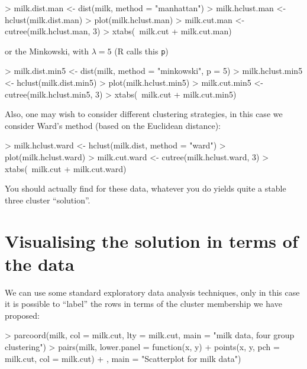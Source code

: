 \begin{Schunk}
\begin{Sinput}
> milk.dist.man <- dist(milk, method = "manhattan")
> milk.hclust.man <- hclust(milk.dist.man)
> plot(milk.hclust.man)
> milk.cut.man <- cutree(milk.hclust.man, 3)
> xtabs(~milk.cut + milk.cut.man)
\end{Sinput}
\end{Schunk}

or the Minkowski, with $\lambda=5$ (R calls this \texttt{p})

\begin{Schunk}
\begin{Sinput}
> milk.dist.min5 <- dist(milk, method = "minkowski", p = 5)
> milk.hclust.min5 <- hclust(milk.dist.min5)
> plot(milk.hclust.min5)
> milk.cut.min5 <- cutree(milk.hclust.min5, 3)
> xtabs(~milk.cut + milk.cut.min5)
\end{Sinput}
\end{Schunk}


Also, one may wish to consider different clustering strategies, in this case we consider Ward's method (based on the Euclidean distance):

\begin{Schunk}
\begin{Sinput}
> milk.hclust.ward <- hclust(milk.dist, method = "ward")
> plot(milk.hclust.ward)
> milk.cut.ward <- cutree(milk.hclust.ward, 3)
> xtabs(~milk.cut + milk.cut.ward)
\end{Sinput}
\end{Schunk}


You should actually find for these data, whatever you do yields quite a stable three cluster ``solution''.


\section{Visualising the solution in terms of the data}

We can use some standard exploratory data analysis techniques, only in this case it is possible to ``label'' the rows in terms of the cluster membership we have proposed:

\begin{Schunk}
\begin{Sinput}
> parcoord(milk, col = milk.cut, lty = milk.cut, main = "milk data, four group clustering")
> pairs(milk, lower.panel = function(x, y) {
+     points(x, y, pch = milk.cut, col = milk.cut)
+ }, main = "Scatterplot for milk data")
\end{Sinput}
\end{Schunk}

